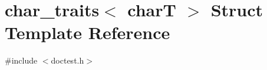 \hypertarget{structchar__traits}{}\section{char\+\_\+traits$<$ charT $>$ Struct Template Reference}
\label{structchar__traits}


{\ttfamily \#include $<$doctest.\+h$>$}

